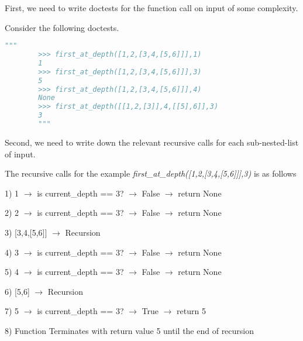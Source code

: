 \documentclass[12pt]{article}
\begin{document}
\begin{enumerate}[a.]
\begin{mdframed}
        \begin{mdframed}
        First, we need to write doctests for the function call on input of some complexity.

        \bigskip

        Consider the following doctests.

        \begin{lstlisting}[language=python]
        """
        >>> first_at_depth([1,2,[3,4,[5,6]]],1)
        1
        >>> first_at_depth([1,2,[3,4,[5,6]]],3)
        5
        >>> first_at_depth([1,2,[3,4,[5,6]]],4)
        None
        >>> first_at_depth([[1,2,[3]],4,[[5],6]],3)
        3
        """
        \end{lstlisting}

        \bigskip

        Second, we need to write down the relevant recursive calls for each sub-nested-list of input.

        \bigskip

        The recursive calls for the example \textit{first\_at\_depth([1,2,[3,4,[5,6]]],3)}
        is as follows

        \begin{mdframed}

            1) 1 $\to$ is current\_depth == 3? $\to$ False $\to$ return None

            2) 2 $\to$ is current\_depth == 3? $\to$ False $\to$ return None

            3) [3,4,[5,6]] $\to$ Recursion

            \bigskip

            \hspace{10mm} 4) 3 $\to$ is current\_depth == 3? $\to$ False $\to$ return None

            \hspace{10mm} 5) 4 $\to$ is current\_depth == 3? $\to$ False $\to$ return None

            \hspace{10mm} 6) [5,6] $\to$ Recursion

            \bigskip

            \hspace{10mm} \hspace{10mm} 7) 5 $\to$ is current\_depth == 3? $\to$ True $\to$ return 5

            \bigskip

            8) Function Terminates with return value 5 until the end of recursion


\end{mdframed}
\end{mdframed}
\end{mdframed}
\end{enumerate}
\end{document}
